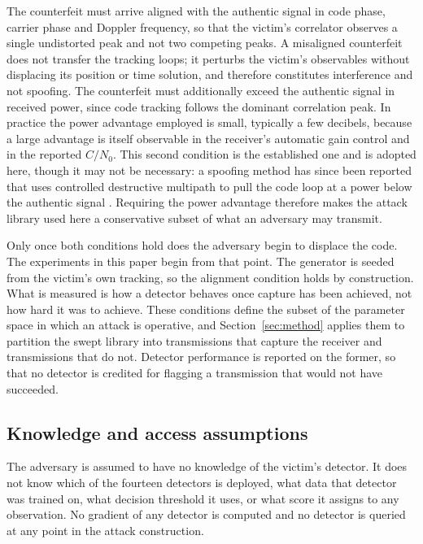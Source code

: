 The counterfeit must arrive aligned with the authentic signal in code phase, carrier phase
and Doppler frequency, so that the victim's correlator observes a single undistorted peak
and not two competing peaks. A misaligned counterfeit does not transfer the tracking
loops; it perturbs the victim's observables without displacing its position or time
solution, and therefore constitutes interference and not spoofing. The counterfeit must
additionally exceed the authentic signal in received power, since code tracking follows the
dominant correlation peak. In practice the power advantage employed is small, typically a
few decibels, because a large advantage is itself observable in the receiver's automatic
gain control and in the reported $C/N_0$. This second condition is the established one
and is adopted here, though it may not be necessary: a spoofing method has since been
reported that uses controlled destructive multipath to pull the code loop at a power
below the authentic signal \citep{liu2026dimas}. Requiring the power advantage therefore
makes the attack library used here a conservative subset of what an adversary may
transmit.

Only once both conditions hold does the adversary begin to displace the code. The
experiments in this paper begin from that point. The generator is seeded from the victim's
own tracking, so the alignment condition holds by construction. What is measured is how a
detector behaves once capture has been achieved, not how hard it was to achieve. These
conditions define the subset of the parameter space in which an attack is operative, and
Section~\ref{sec:method} applies them to partition the swept library into transmissions
that capture the receiver and transmissions that do not. Detector performance is reported
on the former, so that no detector is credited for flagging a transmission that would not
have succeeded.

\subsection{Knowledge and access assumptions}

The adversary is assumed to have no knowledge of the victim's detector. It does not know
which of the fourteen detectors is deployed, what data that detector was trained on, what
decision threshold it uses, or what score it assigns to any observation. No gradient of any
detector is computed and no detector is queried at any point in the attack construction.

